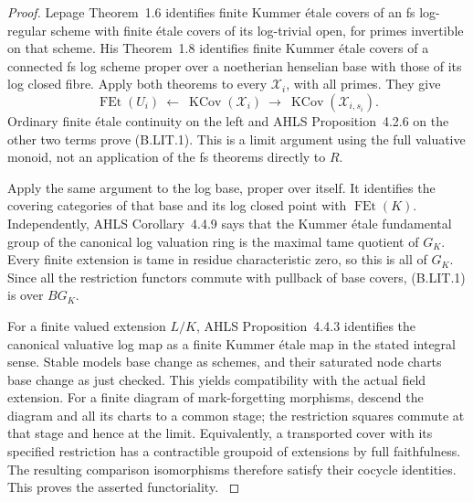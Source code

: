 \documentclass[11pt,a4paper]{article}
\providecommand{\mathscr}{\mathcal}
\begin{document}
\begin{proof}
Lepage Theorem~1.6 identifies finite Kummer \'etale covers of an
fs log-regular scheme with finite \'etale covers of its log-trivial
open, for primes invertible on that scheme. His Theorem~1.8
identifies finite Kummer \'etale covers of a connected fs log
scheme proper over a noetherian henselian base with those of its
log closed fibre. Apply both theorems to every $\mathscr X_i$,
with all primes. They give
\[
 \operatorname{FEt}(U_i)\ \longleftarrow\
 \operatorname{KCov}(\mathscr X_i)\ \longrightarrow\
 \operatorname{KCov}(\mathscr X_{i,s_i}).
\]
Ordinary finite \'etale continuity on the left and AHLS
Proposition~4.2.6 on the other two terms prove (B.LIT.1).
This is a limit argument using the full valuative monoid, not an
application of the fs theorems directly to $R$.
\citep[Theorems~1.6 and 1.8]{Lepage2013}

Apply the same argument to the log base, proper over itself.
It identifies the covering categories of that base and its log
closed point with $\operatorname{FEt}(K)$. Independently, AHLS
Corollary~4.4.9 says that the Kummer \'etale fundamental group of
the canonical log valuation ring is the maximal tame quotient of
$G_K$. Every finite extension is tame in residue characteristic
zero, so this is all of $G_K$. Since all the restriction functors
commute with pullback of base covers, (B.LIT.1) is over $BG_K$.

For a finite valued extension $L/K$, AHLS Proposition~4.4.3
identifies the canonical valuative log map as a finite Kummer
\'etale map in the stated integral sense. Stable models base
change as schemes, and their saturated node charts base change
as just checked. This yields compatibility with the actual field
extension. For a finite diagram of mark-forgetting morphisms,
descend the diagram and all its charts to a common stage; the
restriction squares commute at that stage and hence at the limit.
Equivalently, a transported cover with its specified restriction
has a contractible groupoid of extensions by full faithfulness.
The resulting comparison isomorphisms therefore satisfy their
cocycle identities. This proves the asserted functoriality.
\citep[Proposition~4.4.3, Corollary~4.4.9]{LA_AHLS2024}
\end{proof}
\end{document}

